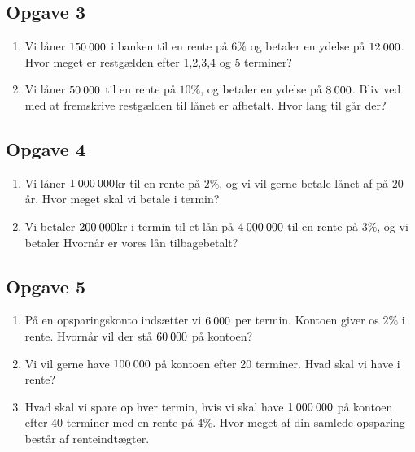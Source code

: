 \documentclass[12pt]{article}
\begin{document}
\subsection*{Opgave 3}
\begin{enumerate}[label=\roman*)]
\item Vi låner $150 \hspace{0.8mm}000$ i banken til en rente på $6\%$ og betaler en ydelse på $12 \hspace{0.8mm} 000$. Hvor meget er restgælden efter 1,2,3,4 og 5 terminer?
\item Vi låner $50 \hspace{0.8mm} 000$ til en rente på $10\%$, og betaler en ydelse på $8\hspace{0.8mm} 000$. Bliv ved med at fremskrive restgælden til lånet er afbetalt. Hvor lang til går der?
\end{enumerate}

\subsection*{Opgave 4}
\begin{enumerate}[label=\roman*)]
\item Vi låner $1\hspace{0.8mm} 000 \hspace{0.8mm} 000 $kr til en rente på $2\%$, og vi vil gerne betale lånet af på 20 år. Hvor meget skal vi betale i termin?
\item Vi betaler $200 \hspace{0.8mm} 000$kr i termin til et lån på $4\hspace{0.8mm} 000 \hspace{0.8mm} 000$ til en rente på $3\%$, og vi betaler  Hvornår er vores lån tilbagebetalt?
\end{enumerate}

\subsection*{Opgave 5}
\begin{enumerate}[label=\roman*)]
	\item På en opsparingskonto indsætter vi $6 \hspace{0.8mm} 000$ per termin. Kontoen giver os $2\%$ i rente. Hvornår
	vil der stå $60 \hspace{0.8mm} 000$ på kontoen?
	\item Vi vil gerne have $100 \hspace{0.8mm} 000$ på kontoen efter 20 terminer. Hvad skal vi have i rente?
	\item Hvad skal vi spare op hver termin, hvis vi skal have $1\hspace{0.8mm} 000 \hspace{0.8mm} 000$ på kontoen efter 40 terminer 
	med en rente på $4\%$. Hvor meget af din samlede opsparing består af renteindtægter.
\end{enumerate}
\end{document}
